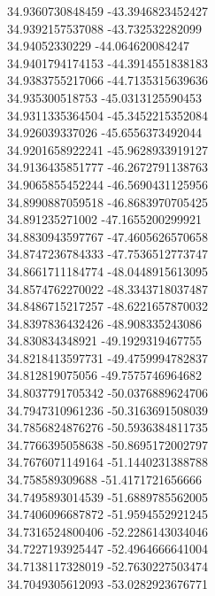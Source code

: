 {34.9360730848459	-43.3946823452427\\
34.9392157537088	-43.732532282099\\
34.94052330229	-44.064620084247\\
34.9401794174153	-44.3914551838183\\
34.9383755217066	-44.7135315639636\\
34.935300518753	-45.0313125590453\\
34.9311335364504	-45.3452215352084\\
34.926039337026	-45.6556373492044\\
34.9201658922241	-45.9628933919127\\
34.9136435851777	-46.2672791138763\\
34.9065855452244	-46.5690431125956\\
34.8990887059518	-46.8683970705425\\
34.891235271002	-47.1655200299921\\
34.8830943597767	-47.4605626570658\\
34.8747236784333	-47.7536512773747\\
34.8661711184774	-48.0448915613095\\
34.8574762270022	-48.3343718037487\\
34.8486715217257	-48.6221657870032\\
34.8397836432426	-48.908335243086\\
34.830834348921	-49.1929319467755\\
34.8218413597731	-49.4759994782837\\
34.812819075056	-49.7575746964682\\
34.8037791705342	-50.0376889624706\\
34.7947310961236	-50.3163691508039\\
34.7856824876276	-50.5936384811735\\
34.7766395058638	-50.8695172002797\\
34.7676071149164	-51.1440231388788\\
34.758589309688	-51.4171721656666\\
34.7495893014539	-51.6889785562005\\
34.7406096687872	-51.9594552921245\\
34.7316524800406	-52.2286143034046\\
34.7227193925447	-52.4964666641004\\
34.7138117328019	-52.7630227503474\\
34.7049305612093	-53.0282923676771\\
}
